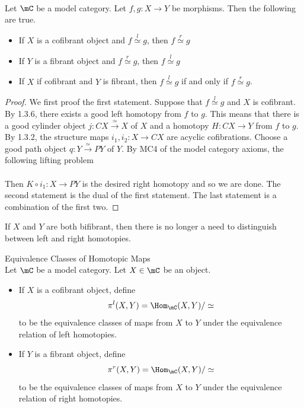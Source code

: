 \documentclass[a4paper]{article}
\begin{document}
\begin{thm}{}{}\\ Let $\mC$ be a model category. Let $f,g:X\to Y$ be morphisms. Then the following are true. 
\begin{itemize}
\item If $X$ is a cofibrant object and $f\overset{l}{\simeq}g$, then $f\overset{r}{\simeq}g$
\item If $Y$ is a fibrant object and $f\overset{r}{\simeq}g$, then $f\overset{l}{\simeq}g$
\item If $X$ if cofibrant and $Y$ is fibrant, then $f\overset{l}{\simeq}g$ if and only if $f\overset{r}{\simeq}g$. 
\end{itemize} 
\begin{proof}
We first proof the first statement. Suppose that $f\overset{l}{\simeq}g$ and $X$ is cofibrant. By 1.3.6, there exists a good left homotopy from $f$ to $g$. This means that there is a good cylinder object $j:CX\overset{\simeq}{\longrightarrow} X$ of $X$ and a homotopy $H:CX\to Y$ from $f$ to $g$. By 1.3.2, the structure maps $i_1,i_2:X\to CX$ are acyclic cofibrations. Choose a good path object $q:Y\overset{\simeq}{\longrightarrow}PY$ of $Y$. By MC4 of the model category axioms, the following lifting problem \\
\\ 
Then $K\circ i_1:X\to PY$ is the desired right homotopy and so we are done. The second statement is the dual of the first statement. The last statement is a combination of the first two. 
\end{proof}
\end{thm}

If $X$ and $Y$ are both bifibrant, then there is no longer a need to distinguish between left and right homotopies. 

\begin{defn}{Equivalence Classes of Homotopic Maps}{}\\ Let $\mC$ be a model category. Let $X\in\mC$ be an object. 
\begin{itemize}
\item If $X$ is a cofibrant object, define $$\pi^l(X,Y)=\Hom_\mC(X,Y)/\simeq$$ to be the equivalence classes of maps from $X$ to $Y$ under the equivalence relation of left homotopies. 
\item If $Y$ is a fibrant object, define $$\pi^r(X,Y)=\Hom_\mC(X,Y)/\simeq$$ to be the equivalence classes of maps from $X$ to $Y$ under the equivalence relation of right homotopies. 
\end{itemize}
\end{defn}
\end{document}
